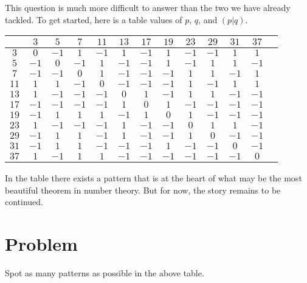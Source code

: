 \documentclass[a4paper]{article}
\newcommand{\ileg}[2]{(#1|#2)}
\newcommand{\marginnote}[1]{\marginpar{\footnotesize{#1}}}
\begin{document}
This question is much more difficult to answer
than the two we have already tackled.
To get started, here is a table values of \(p\), \(q\), and \(\ileg{p}{q}\).
\begin{center}
	\begin{tabular}{|c||c|c|c|c|c|c|c|c|c|c|c|c|}
		\hline
		\diagbox{\(p\)}{\(q\)}& \(3\)&\(5\)&\(7\)&\(11\)&\(13\)&\(17\)&\(19\)&\(23\)&\(29\)&\(31\)&\(37\)\\
		\hline\hline
		\(3\)& \(0\)&	\(-1\)&	\(1\)&	\(-1\)&	\(1\)&	\(-1\)&	\(1\)&	\(-1\)&	\(-1\)&	\(1\)&	\(1\)\\ \hline
		\(5\)&\(-1\)&	\(0\)&	\(-1\)&	\(1\)&	\(-1\)&	\(-1\)&	\(1\)&	\(-1\)&	\(1\)&	\(1\)&	\(-1\)\\ \hline
		\(7\)&\(-1\)&	\(-1\)&	\(0\)&	\(1\)&	\(-1\)&	\(-1\)&	\(-1\)&	\(1\)&	\(1\)&	\(-1\)&	\(1\)\\ \hline
		\(11\)&\(1\)&	\(1\)&	\(-1\)&	\(0\)&	\(-1\)&	\(-1\)&	\(-1\)&	\(1\)&	\(-1\)&	\(1\)&	\(1\)\\ \hline
		\(13\)&\(1\)&	\(-1\)&	\(-1\)&	\(-1\)&	\(0\)&	\(1\)&	\(-1\)&	\(1\)&	\(1\)&	\(-1\)&	\(-1\)\\ \hline
		\(17\)&\(-1\)&	\(-1\)&	\(-1\)&	\(-1\)&	\(1\)&	\(0\)&	\(1\)&	\(-1\)&	\(-1\)&	\(-1\)&	\(-1\)\\ \hline
		\(19\)&\(-1\)&	\(1\)&	\(1\)&	\(1\)&	\(-1\)&	\(1\)&	\(0\)&	\(1\)&	\(-1\)&	\(-1\)&	\(-1\)\\ \hline
		\(23\)&\(1\)&	\(-1\)&	\(-1\)&	\(-1\)&	\(1\)&	\(-1\)&	\(-1\)&	\(0\)&	\(1\)&	\(1\)&	\(-1\)\\ \hline
		\(29\)&\(-1\)&	\(1\)&	\(1\)&	\(-1\)&	\(1\)&	\(-1\)&	\(-1\)&	\(1\)&	\(0\)&	\(-1\)&	\(-1\)\\ \hline
		\(31\)&\(-1\)&	\(1\)&	\(1\)&	\(-1\)&	\(-1\)&	\(-1\)&	\(1\)&	\(-1\)&	\(-1\)&	\(0\)&	\(-1\)\\ \hline
		\(37\)&\(1\)&	\(-1\)&	\(1\)&	\(1\)&	\(-1\)&	\(-1\)&	\(-1\)&	\(-1\)&	\(-1\)&	\(-1\)&	\(0\)\\ \hline
	\end{tabular}
\end{center}
In the table there exists a pattern that is at the heart
of what may be the most beautiful theorem in number theory.
\marginnote{Admittedly I am biased.}
But for now, the story remains to be continued.
\section*{Problem}
Spot as many patterns as possible in the above table.
\end{document}
